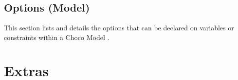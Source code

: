 \chapter{Options (Model)}\label{ch:options}\hypertarget{ch:options}{}
This section lists and details the options that can be declared on variables or constraints within a Choco Model .


\part{Extras}\label{ch:extra}\hypertarget{ch:extra}{}


